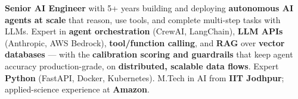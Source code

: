 \documentclass[letter,10pt]{article}
\begin{document}

\textbf{Senior AI Engineer} with 5+ years building and deploying \textbf{autonomous AI agents at scale} that reason, use tools, and complete multi-step tasks with LLMs.
Expert in \textbf{agent orchestration} (CrewAI, LangChain), \textbf{LLM APIs} (Anthropic, AWS Bedrock), \textbf{tool/function calling}, and \textbf{RAG} over \textbf{vector databases} --- with the \textbf{calibration scoring and guardrails} that keep agent accuracy production-grade, on \textbf{distributed, scalable data flows}.
Expert \textbf{Python} (FastAPI, Docker, Kubernetes). M.Tech in AI from \textbf{IIT Jodhpur}; applied-science experience at \textbf{Amazon}.
\end{document}
